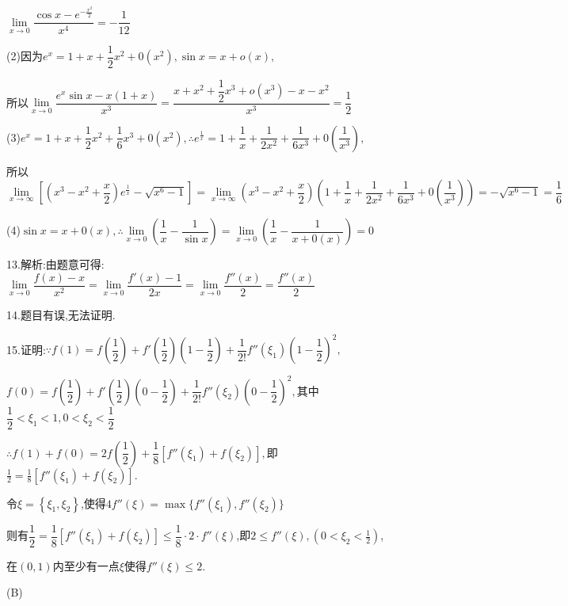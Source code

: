 $\lim\limits_{x \to 0}  \dfrac{{\cos x - {e^{ - \frac{{{x^2}}}{2}}}}}{{{x^4}}} =  - \dfrac{1}{{12}}$

(2)因为${e^x} = 1 + x + \dfrac{1}{2}{x^2} + 0({x^2}),\sin x = x + o(x),$

所以$\lim\limits_{x \to 0}  \dfrac{{{e^x}\sin x - x(1 + x)}}{{{x^3}}} = \dfrac{{x + {x^2} + \dfrac{1}{2}{x^3} + o({x^3}) - x - {x^2}}}{{{x^3}}} = \dfrac{1}{2}$

(3)${e^x} = 1 + x + \dfrac{1}{2}{x^2} + \dfrac{1}{6}{x^3} + 0({x^2}),\therefore {e^{\frac{1}{x}}} = 1 + \dfrac{1}{x} + \dfrac{1}{{2{x^2}}} + \dfrac{1}{{6{x^3}}} + 0(\dfrac{1}{{{x^3}}}),$

所以$\mathop {\lim }\limits_{x \to \infty } [({x^3} - {x^2} + \dfrac{x}{2}){e^{\frac{1}{x}}} - \sqrt {{x^6} - 1} ] = \mathop {\lim }\limits_{x \to \infty } ({x^3} - {x^2} + \dfrac{x}{2})\left( {1 + \dfrac{1}{x} + \dfrac{1}{{2{x^2}}} + \dfrac{1}{{6{x^3}}} + 0(\dfrac{1}{{{x^3}}})} \right) =  - \sqrt {{x^6} - 1}  = \dfrac{1}{6}$

(4)$\sin x = x + 0(x),\therefore \lim\limits_{x \to 0}  (\dfrac{1}{x} - \dfrac{1}{{\sin x}}) = \lim\limits_{x \to 0}  (\dfrac{1}{x} - \dfrac{1}{{x + 0(x)}}) = 0$

13.解析:由题意可得:$\lim\limits_{x \to 0}  \dfrac{{f(x) - x}}{{{x^2}}} = \lim\limits_{x \to 0}  \dfrac{{f'(x) - 1}}{{2x}} = \lim\limits_{x \to 0}  \dfrac{{f''(x)}}{2} = \dfrac{{f''(x)}}{2}$

14.题目有误,无法证明.

15.证明:$\because f(1) = f(\dfrac{1}{2}) + f'(\dfrac{1}{2})(1 - \dfrac{1}{2}) + \dfrac{1}{{2!}}f''({\xi _1}){(1 - \dfrac{1}{2})^2},$

$f(0) = f(\dfrac{1}{2}) + f'(\dfrac{1}{2})(0 - \dfrac{1}{2}) + \dfrac{1}{{2!}}f''({\xi _2}){(0 - \dfrac{1}{2})^2},$其中$\dfrac{1}{2} < {\xi _1} < 1,0 < {\xi _2} < \dfrac{1}{2}$

$\therefore f(1) + f(0) = 2f(\dfrac{1}{2}) + \dfrac{1}{8}[f''({\xi _1}) + f({\xi _2})],$即$\frac{1}{2} = \frac{1}{8}[f''({\xi _1}) + f({\xi _2})].$

令$\xi  = \left\{ {{\xi _1},{\xi _2}} \right\}$,使得$4f''(\xi ) = \max \{ f''({\xi _1}),f''({\xi _2})\} $

则有$\dfrac{1}{2} = \dfrac{1}{8}[f''({\xi _1}) + f({\xi _2})] \le \dfrac{1}{8} \cdot 2 \cdot f''(\xi )$,即$2 \le f''(\xi ),\left( {0 < {\xi _2} < \frac{1}{2}} \right)$,

在$(0,1)$内至少有一点$\xi $使得$f''(\xi ) \le 2$.

(B)

